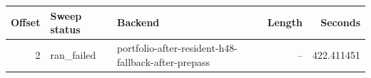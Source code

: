 {\small
\begin{tabular}{rllrr}
\hline
Offset & Sweep status & Backend & Length & Seconds \\
\hline
2 & ran_failed & portfolio-after-resident-h48-fallback-after-prepass & -- & 422.411451 \\
\hline
\end{tabular}
}
